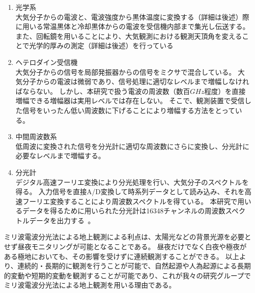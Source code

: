 \begin{enumerate}
    \item 光学系 \mbox{} \\
        大気分子からの電波と、電波強度から黒体温度に変換する（詳細は後述）際に用いる常温黒体と冷却黒体からの電波を受信機内部まで集光し伝送する。
        また、回転鏡を用いることにより、大気観測における観測天頂角を変えることで光学的厚みの測定（詳細は後述）を行っている
    \item ヘテロダイン受信機 \mbox{} \\
        大気分子からの信号を局部発振器からの信号をミクサで混合している。
        大気分子からの電波は微弱であり、信号処理に適切なレベルまで増幅しなければならない。
        しかし、本研究で扱う電波の周波数（数百$GHz$程度）を直接増幅できる増幅器は実用レベルでは存在しない。
        そこで、観測装置で受信した信号をいったん低い周波数に下げることにより増幅する方法をとっている。
    \item 中間周波数系 \mbox{} \\
        低周波に変換された信号を分光計に適切な周波数にさらに変換し、分光計に必要なレベルまで増幅する。
    \item 分光計 \mbox{} \\
        デジタル高速フーリエ変換により分光処理を行い、大気分子のスペクトルを得る。
        入力信号を直接A/D変換して時系列データとして読み込み、それを高速フーリエ変換することにより周波数スペクトルを得ている。
        本研究で用いるデータを得るために用いられた分光計は16348チャンネルの周波数スペクトルデータを出力する~\cite{ito2017master}。
\end{enumerate}
ミリ波電波分光法による地上観測による利点は、太陽光などの背景光源を必要とせず昼夜モニタリングが可能となることである。
昼夜だけでなく白夜や極夜がある極地においても、その影響を受けずに連続観測することができる。
以上より、連続的・長期的に観測を行うことが可能で、自然起源や人為起源による長期的変動や短期的変動を観測することが可能であり、これが我々の研究グループでミリ波電波分光法による地上観測を用いる理由である。


